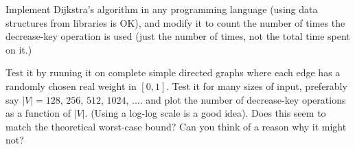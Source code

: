 \documentclass[12pt, letterpaper]{article}
\begin{document}
\begin{enumerate}
Implement Dijkstra's algorithm in any programming language (using data structures from libraries is OK), and modify
it to count
the number of times the decrease-key operation is used (just the number of times, not the total time spent on it.)

Test it by running it on complete simple directed graphs where each edge has a randomly chosen real weight in $[0,1]$.  
Test it for many sizes of input, preferably  say $|V|=128$, $256$, $512$, $1024$, ....    
and plot the number of decrease-key operations  as a function of $|V|$. (Using a log-log scale is a good idea).  Does
this seem to match the theoretical worst-case bound?  Can you think of a reason why it might not?  

\end{enumerate}
\end{document}
